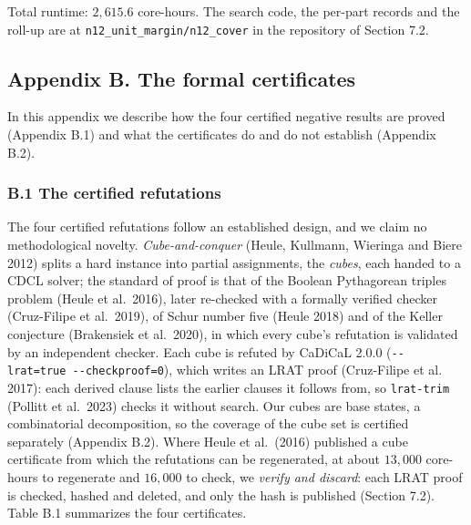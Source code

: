 \documentclass[
]{article}
\begin{document}
Total runtime: \(2{,}615.6\) core-hours. The search code, the per-part
records and the roll-up are at \texttt{n12\_unit\_margin/n12\_cover} in
the repository of Section 7.2.

\setcounter{table}{0}\setcounter{figure}{0}

\subsection{Appendix B. The formal
certificates}\label{appendix-b.-the-formal-certificates}

In this appendix we describe how the four certified negative results are
proved (Appendix B.1) and what the certificates do and do not establish
(Appendix B.2).

\subsubsection{B.1 The certified
refutations}\label{b.1-the-certified-refutations}

The four certified refutations follow an established design, and we
claim no methodological novelty. \emph{Cube-and-conquer} (Heule,
Kullmann, Wieringa and Biere 2012) splits a hard instance into partial
assignments, the \emph{cubes}, each handed to a CDCL solver; the
standard of proof is that of the Boolean Pythagorean triples problem
(Heule et al.~2016), later re-checked with a formally verified checker
(Cruz-Filipe et al.~2019), of Schur number five (Heule 2018) and of the
Keller conjecture (Brakensiek et al.~2020), in which every cube's
refutation is validated by an independent checker. Each cube is refuted
by CaDiCaL 2.0.0 (\texttt{-\/-lrat=true\ -\/-checkproof=0}), which
writes an LRAT proof (Cruz-Filipe et al. 2017): each derived clause
lists the earlier clauses it follows from, so \texttt{lrat-trim}
(Pollitt et al.~2023) checks it without search. Our cubes are base
states, a combinatorial decomposition, so the coverage of the cube set
is certified separately (Appendix B.2). Where Heule et al.~(2016)
published a cube certificate from which the refutations can be
regenerated, at about \(13{,}000\) core-hours to regenerate and
\(16{,}000\) to check, we \emph{verify and discard}: each LRAT proof is
checked, hashed and deleted, and only the hash is published (Section
7.2). Table B.1 summarizes the four certificates.
\end{document}
